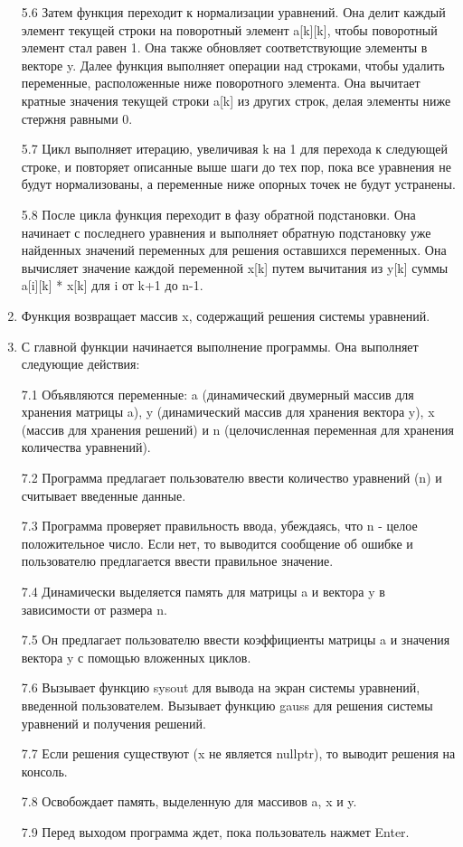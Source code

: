 \documentclass[12pt,a4paper]{scrartcl}
\begin{document}
\begin{enumerate}
5.6 Затем функция переходит к нормализации уравнений. Она делит каждый элемент текущей строки на поворотный элемент a[k][k], чтобы поворотный элемент стал равен 1. Она также обновляет соответствующие элементы в векторе y.
Далее функция выполняет операции над строками, чтобы удалить переменные, расположенные ниже поворотного элемента. Она вычитает кратные значения текущей строки a[k] из других строк, делая элементы ниже стержня равными 0.

5.7 Цикл выполняет итерацию, увеличивая k на 1 для перехода к следующей строке, и повторяет описанные выше шаги до тех пор, пока все уравнения не будут нормализованы, а переменные ниже опорных точек не будут устранены.

5.8 После цикла функция переходит в фазу обратной подстановки. Она начинает с последнего уравнения и выполняет обратную подстановку уже найденных значений переменных для решения оставшихся переменных. Она вычисляет значение каждой переменной x[k] путем вычитания из y[k] суммы a[i][k] * x[k] для i от k+1 до n-1.

    \item Функция возвращает массив x, содержащий решения системы уравнений.

    \item С главной функции начинается выполнение программы. Она выполняет следующие действия:

7.1 Объявляются переменные: a (динамический двумерный массив для хранения матрицы a), y (динамический массив для хранения вектора y), x (массив для хранения решений) и n (целочисленная переменная для хранения количества уравнений).

7.2 Программа предлагает пользователю ввести количество уравнений (n) и считывает введенные данные.

7.3 Программа проверяет правильность ввода, убеждаясь, что n - целое положительное число. Если нет, то выводится сообщение об ошибке и пользователю предлагается ввести правильное значение.

7.4 Динамически выделяется память для матрицы a и вектора y в зависимости от размера n.

7.5 Он предлагает пользователю ввести коэффициенты матрицы a и значения вектора y с помощью вложенных циклов.

7.6 Вызывает функцию sysout для вывода на экран системы уравнений, введенной пользователем.
Вызывает функцию gauss для решения системы уравнений и получения решений.

7.7 Если решения существуют (x не является nullptr), то выводит решения на консоль.

7.8 Освобождает память, выделенную для массивов a, x и y.

7.9 Перед выходом программа ждет, пока пользователь нажмет Enter.
\end{enumerate}
\end{document}
